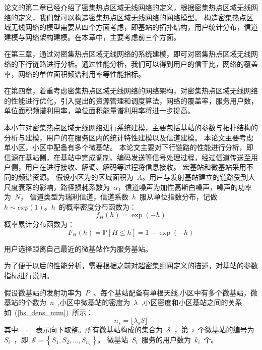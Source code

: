 

论文的第二章已经介绍了密集热点区域无线网络的定义，根据密集热点区域无线网络的定义，我们就可以构造密集热点区域无线网络的网络模型。
构造密集热点区域无线网络的模型需要从四个方面考虑，即基站的拓扑结构，用户统计分布，信道建模与网络架构建模。在本章中，主要考虑前三个方面。

在第三章，通过对密集热点区域无线网络的系统建模，即可对密集热点区域无线网络的下行链路进行分析。通过性能分析，我们可以得到用户的信干比，网络的覆盖率，网络的单位面积频谱利用率等性能指标。

在第四章，着重考虑密集热点区域无线网络的网络架构，对密集热点区域无线网络的性能进行优化，引入提出的资源管理和调度算法，网络的覆盖率，服务用户数，单位面积频谱利用率，单位面积能量谱利用率将进一步提高。


本小节对密集热点区域无线网络进行系统建模，主要包括基站的参数与拓扑结构的分析与建模，用户的在服务区内的统计特性建模以及信道建模。
本论文主要考虑单小区，小区中配备有多个微基站。
本论文主要对下行链路的性能进行分析，即信源在基站侧，在基站中完成调制、编码发送等信号处理过程，经过信道传送至用户侧，用户在进行接收、解调、解码等过程将信息接收。
宏基站和微基站采用不同的频谱资源。
假设小区为的区域面积为~$A$。用户与发射基站建立的链路受到大尺度衰落的影响，路径损耗系数为~$\alpha$，信道噪声为加性高斯白噪声，噪声的功率为~$N$，
信道类型为瑞利信道，信道系数~$h$~服从单位指数分布，记做~$h\sim exp(1)$。$h$~的概率密度分布函数为：
\begin{equation}\label{h_pdf}
  f_H(h) = \exp(-h)
\end{equation}
概率累计分布函数为：
\begin{equation}\label{h_cdf}
  F_H(h) = \mathbb{P}[H\leq h] = 1 - \exp(-h)
\end{equation}

用户选择距离自己最近的微基站作为服务基站。

为了便于以后的性能分析，需要根据之前对超密集组网定义的描述，对基站的参数指标进行说明。

假设微基站的发射功率为~$P$~、每个基站配备有单根天线,小区中有多个微基站，微基站的个数为~$n$~,小区中微基站的密度为~$\lambda$~,小区密度和小区基站之间的关系如~(\ref{bs_dens_num})~所示：
\begin{equation}\label{bs_dens_num}
  n_s = \biggl\lfloor\lambda_s S\biggr\rfloor
\end{equation}
其中~$\biggl\lfloor\cdot\biggr\rfloor$~表示向下取整。所有微基站构成的集合为~$\mathcal{S}$~，第~$i$~个微基站的编号为~$S_i$~，即~$\mathcal{S}=\left\{S_1, S_2,\dots,S_{n_s}\right\}$。
微基站~$S_i$~服务的用户数为~$k_i$~个。

